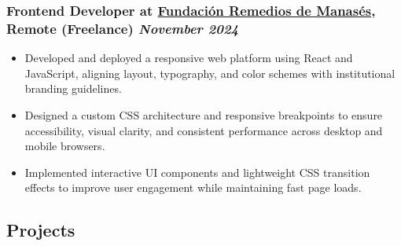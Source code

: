 \documentclass[a4paper,10pt]{article}
\begin{document}
\subsubsection*{%
  \textbf{Frontend Developer} at \href{https://fundacion-remedios.vercel.app/}{Fundación Remedios de Manasés}, Remote (Freelance)
  \hfill
  \textit{November 2024}
}
\begin{itemize}
  \item Developed and deployed a responsive web platform using React and JavaScript, aligning layout, typography, and color schemes with institutional branding guidelines.
  \item Designed a custom CSS architecture and responsive breakpoints to ensure accessibility, visual clarity, and consistent performance across desktop and mobile browsers.
  \item Implemented interactive UI components and lightweight CSS transition effects to improve user engagement while maintaining fast page loads.
\end{itemize}

\subsection*{Projects}
\end{document}
